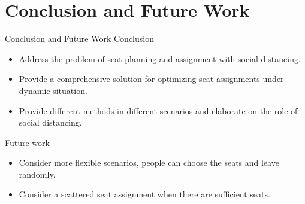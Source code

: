 
\section{Conclusion and Future Work}
\frame{\sectionpage}

\begin{frame}{Conclusion and Future Work}
    Conclusion 

    \begin{itemize}
        \item Address the problem of seat planning and assignment with social distancing.
        
        \item Provide a comprehensive solution for optimizing seat assignments under dynamic situation.

        \item Provide different methods in different scenarios and elaborate on the role of social distancing.
    \end{itemize}

    Future work

    \begin{itemize}        
        \item Consider more flexible scenarios, people can choose the seats and leave randomly.

        \item Consider a scattered seat assignment when there are sufficient seats.
    \end{itemize}

\end{frame}
